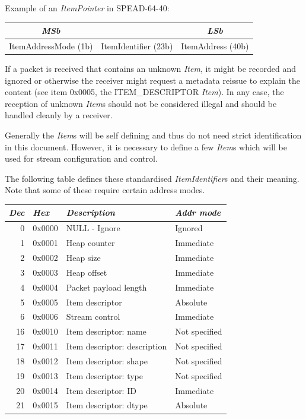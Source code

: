 \documentclass[11pt,english,twoside]{article}
\begin{document}
Example of an \emph{ItemPointer} in SPEAD-64-40:

\begin{tabular}{|c|c|c|}
\hline
\emph{MSb} && \emph{LSb} \\
\hline
ItemAddressMode (1b) & ItemIdentifier (23b) & ItemAddress (40b)\\
\hline
\end{tabular}

If a packet is received that contains an unknown \emph{Item}, it might be recorded and ignored or otherwise the receiver might request a
metadata reissue to explain the content (see item 0x0005, the ITEM\_DESCRIPTOR \emph{Item}). In any case, the reception of unknown \emph{Item}s
should not be considered illegal and should be handled cleanly by a receiver.

Generally the \emph{Item}s will be self defining and thus do not need strict identification in this document. However, it is necessary to define
a few \emph{Item}s which will be used for stream configuration and control.

The following table defines these standardised \emph{ItemIdentifier}s and their meaning. Note that some of these require certain address modes.

\begin{tabular}{|r|l|l|l|}
\hline
\emph{Dec} & \emph{Hex} & \emph{Description} & \emph{Addr mode} \\
\hline
 0 & 0x0000 & NULL - Ignore            & Ignored   \\
 1 & 0x0001 & Heap counter             & Immediate \\
 2 & 0x0002 & Heap size                & Immediate \\
 3 & 0x0003 & Heap offset              & Immediate \\
 4 & 0x0004 & Packet payload length    & Immediate \\
 5 & 0x0005 & Item descriptor          & Absolute  \\
 6 & 0x0006 & Stream control           & Immediate \\
16 & 0x0010 & Item descriptor: name    & Not specified \\
17 & 0x0011 & Item descriptor: description & Not specified \\
18 & 0x0012 & Item descriptor: shape   & Not specified \\
19 & 0x0013 & Item descriptor: type    & Not specified \\
20 & 0x0014 & Item descriptor: ID      & Immediate \\
21 & 0x0015 & Item descriptor: dtype   & Absolute \\
\hline
\end{tabular}
\end{document}
